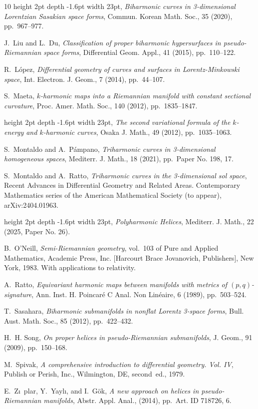 \documentclass[11pt]{amsart}
\theoremstyle{plain}
\theoremstyle{definition}
\numberwithin{equation}{section}
\begin{document}
\begin{thebibliography}{10}
\leavevmode\vrule height 2pt depth -1.6pt width 23pt, {\em Biharmonic curves in
  3-dimensional {L}orentzian {S}asakian space forms}, Commun. Korean Math.
  Soc., 35 (2020), pp.~967--977.

{\sc J.~Liu and L.~Du}, {\em Classification of proper biharmonic hypersurfaces
  in pseudo-{R}iemannian space forms}, Differential Geom. Appl., 41 (2015),
  pp.~110--122.

{\sc R.~L\'{o}pez}, {\em Differential geometry of curves and surfaces in
  {L}orentz-{M}inkowski space}, Int. Electron. J. Geom., 7 (2014), pp.~44--107.

{\sc S.~Maeta}, {\em {$k$}-harmonic maps into a {R}iemannian manifold with
  constant sectional curvature}, Proc. Amer. Math. Soc., 140 (2012),
  pp.~1835--1847.

\leavevmode\vrule height 2pt depth -1.6pt width 23pt, {\em The second
  variational formula of the {$k$}-energy and {$k$}-harmonic curves}, Osaka J.
  Math., 49 (2012), pp.~1035--1063.

{\sc S.~Montaldo and A.~P\'{a}mpano}, {\em Triharmonic curves in 3-dimensional
  homogeneous spaces}, Mediterr. J. Math., 18 (2021), pp.~Paper No. 198, 17.

{\sc S.~Montaldo and A.~Ratto}, {\em Triharmonic curves in the 3-dimensional
  sol space}, Recent Advances in Differential Geometry and Related Areas.
  Contemporary Mathematics series of the American Mathematical Society (to
  appear), arXiv:2404.01963.

\leavevmode\vrule height 2pt depth -1.6pt width 23pt, {\em Polyharmonic
  {H}elices}, Mediterr. J. Math., 22 (2025, Paper No. 26).

{\sc B.~O'Neill}, {\em Semi-{R}iemannian geometry}, vol.~103 of Pure and
  Applied Mathematics, Academic Press, Inc. [Harcourt Brace Jovanovich,
  Publishers], New York, 1983.
\newblock With applications to relativity.

{\sc A.~Ratto}, {\em Equivariant harmonic maps between manifolds with metrics
  of {$(p,q)$}-signature}, Ann. Inst. H. Poincar\'{e} C Anal. Non Lin\'{e}aire,
  6 (1989), pp.~503--524.

{\sc T.~Sasahara}, {\em Biharmonic submanifolds in nonflat {L}orentz 3-space
  forms}, Bull. Aust. Math. Soc., 85 (2012), pp.~422--432.

{\sc H.~H. Song}, {\em On proper helices in pseudo-{R}iemannian submanifolds},
  J. Geom., 91 (2009), pp.~150--168.

{\sc M.~Spivak}, {\em A comprehensive introduction to differential geometry.
  {V}ol. {IV}}, Publish or Perish, Inc., Wilmington, DE, second~ed., 1979.

{\sc E.~Z\i~plar, Y.~Yayl\i, and I.~G\"{o}k}, {\em A new approach on helices in
  pseudo-{R}iemannian manifolds}, Abstr. Appl. Anal.,  (2014), pp.~Art. ID
  718726, 6.

\end{thebibliography}
\end{document}
